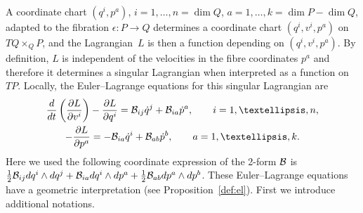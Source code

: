 \documentclass[11pt]{article}
\newcommand{\B}{{\cal B}}
\newcommand{\e}{\epsilon}
\def\fpd#1#2{\frac{\partial #1}{\partial #2}}
\begin{document}
A coordinate chart $(q^i,p^a)$, $i=1,\ldots,n=\dim Q$, $a=1,\ldots,k=\dim P-\dim Q$,  adapted to the f\/ibration $\e: P\to Q$ determines a coordinate chart $(q^i,v^i,p^a)$ on $TQ\times_Q P$, and the Lagrangian~$L$ is then a function depending on $(q^i,v^i,p^a)$. By def\/inition, $L$ is independent of the velocities in the f\/ibre coordinates $p^a$ and therefore it determines a singular Lagrangian when interpreted as a function on $TP$. Locally, the Euler--Lagrange equations for this singular Lagrangian are
\begin{gather*}
\frac{d}{dt}\left(\fpd{L}{v^i}\right) -\fpd{L}{q^i}=\B_{ij} \dot q^j + \B_{ia} \dot p^a,\qquad  i=1,\ldots,n,\\
  -\fpd{L}{p^a}=-\B_{ia} \dot q^i+ \B_{ab}\dot p^b,\qquad a=1,\ldots,k.
\end{gather*}
Here we used the following coordinate expression of the 2-form $\B$ is $\frac12 \B_{ij} dq^i \wedge dq^j + \B_{ia}dq^i\wedge dp^a + \frac12 \B_{ab} dp^a\wedge dp^b$.
These Euler--Lagrange equations have a geometric interpretation (see Proposition~\ref{def:el}). First we introduce additional notations.
\end{document}
